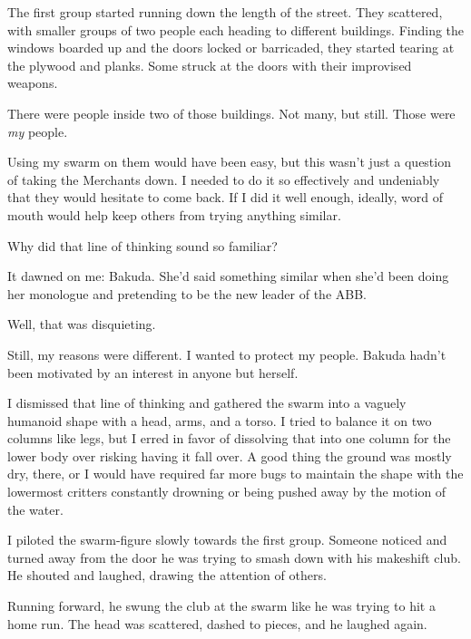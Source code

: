 The first group started running down the length of the street.  They scattered, with smaller groups of two people each heading to different buildings.  Finding the windows boarded up and the doors locked or barricaded, they started tearing at the plywood and planks.  Some struck at the doors with their improvised weapons.



There were people inside two of those buildings.  Not many, but still.  Those were \emph{my} people.



Using my swarm on them would have been easy, but this wasn't just a question of taking the Merchants down.  I needed to do it so effectively and undeniably that they would hesitate to come back.  If I did it well enough, ideally, word of mouth would help keep others from trying anything similar.



Why did that line of thinking sound so familiar?



It dawned on me: Bakuda.  She'd said something similar when she'd been doing her monologue and pretending to be the new leader of the ABB.



Well, that was disquieting.



Still, my reasons were different.  I wanted to protect my people.  Bakuda hadn't been motivated by an interest in anyone but herself.



I dismissed that line of thinking and gathered the swarm into a vaguely humanoid shape with a head, arms, and a torso.  I tried to balance it on two columns like legs, but I erred in favor of dissolving that into one column for the lower body over risking having it fall over.  A good thing the ground was mostly dry, there, or I would have required far more bugs to maintain the shape with the lowermost critters constantly drowning or being pushed away by the motion of the water.



I piloted the swarm-figure slowly towards the first group.  Someone noticed and turned away from the door he was trying to smash down with his makeshift club.  He shouted and laughed, drawing the attention of others.



Running forward, he swung the club at the swarm like he was trying to hit a home run.  The head was scattered, dashed to pieces, and he laughed again.



